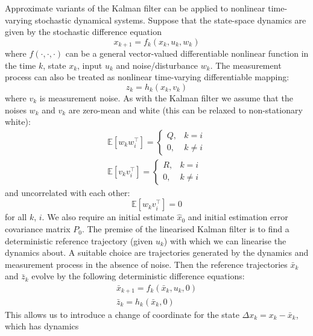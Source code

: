 \documentclass[11pt]{report} %
\begin{document}
Approximate variants of the Kalman filter can be applied to nonlinear time-varying stochastic dynamical systems. Suppose that the state-space dynamics are given by the stochastic difference equation
\begin{equation}
x_{k + 1} = f_{k}\left(x_{k}, u_{k}, w_{k}\right)
\end{equation}
where $f\left(\cdot, \cdot, \cdot\right)$ can be a general vector-valued differentiable nonlinear function in the time $k$, state $x_{k}$, input $u_{k}$ and noise/disturbance $w_{k}$. The measurement process can also be treated as nonlinear time-varying differentiable mapping:
\begin{equation}
z_{k} = h_{k}\left(x_{k}, v_{k}\right)
\end{equation}
where $v_{k}$ is measurement noise. As with the Kalman filter we assume that the noises $w_{k}$ and $v_{k}$ are zero-mean and white (this can be relaxed to non-stationary white):
\begin{gather}
\mathbb{E}\left[w_{k}w_{i}^{\top}\right] = \begin{cases} Q, & k = i \\ 0, & k \neq i \end{cases} \\
\mathbb{E}\left[v_{k}v_{i}^{\top}\right] = \begin{cases} R, & k = i \\ 0, & k \neq i \end{cases}
\end{gather}
and uncorrelated with each other:
\begin{equation}
\mathbb{E}\left[w_{k}v_{i}^{\top}\right] = 0
\end{equation}
for all $k$, $i$. We also require an initial estimate $\hat{x}_{0}$ and initial estimation error covariance matrix $P_{0}$. The premise of the linearised Kalman filter is to find a deterministic reference trajectory (given $u_{k}$) with which we can linearise the dynamics about. A suitable choice are trajectories generated by the dynamics and measurement process in the absence of noise. Then the reference trajectories $\bar{x}_{k}$ and $\bar{z}_{k}$ evolve by the following deterministic difference equations:
\begin{gather}
\bar{x}_{k + 1} = f_{k}\left(\bar{x}_{k}, u_{k}, 0\right) \\
\bar{z}_{k} = h_{k}\left(\bar{x}_{k}, 0\right)
\end{gather}
This allows us to introduce a change of coordinate for the state $\Delta x_{k} = x_{k} - \bar{x}_{k}$, which has dynamics
\end{document}
